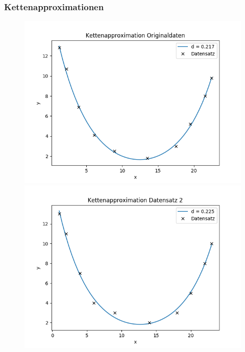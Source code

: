 \documentclass[a4paper, 11pt]{beamer}
\begin{document}
\begin{frame}
    \frametitle{Kettenapproximationen}

    \begin{figure}
        \centering
        \begin{minipage}{.4\textwidth}
            \includegraphics[scale=0.31]{kettenapproximation_originaldaten}
        \end{minipage}
        \begin{minipage}{.4\textwidth}
            \includegraphics[scale=0.31]{kettenapproximation_ds2}
        \end{minipage}
        \begin{minipage}{.4\textwidth}

\end{minipage}
\end{figure}
\end{frame}
\end{document}
